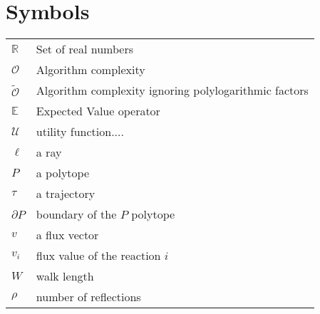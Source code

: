 \documentclass[master=elt, cleveref, autoref, masteroption=eg]{kulemt}
\def\RR{{\mathbb R}}
\newcommand{\OO}{\mathcal{O}\xspace}
\newcommand{\sO}{\widetilde{\mathcal{O}}\xspace}
\begin{document}
\section*{Symbols}
   \begin{flushleft}
   \renewcommand{\arraystretch}{1.1}
   \begin{tabularx}{\textwidth}{@{}p{12mm}X@{}}
      $\RR$          & Set of real numbers\\
      $\OO$          & Algorithm complexity\\
      $\sO$          & Algorithm complexity ignoring polylogarithmic factors\\
      $\mathbb{E}$   & Expected Value operator\\
      $\mathcal{U}$  & utility function....\\
      $\ell$         & a ray\\
      $P$            & a polytope\\
      $\tau$         & a trajectory\\
      $\partial P$   & boundary of the $P$ polytope\\
      $v$            & a flux vector\\
      $v_i$          & flux value of the reaction $i$\\
      $W$            & walk length\\
      $\rho$         & number of reflections\\
   \end{tabularx}
\end{flushleft}


\mainmatter

% 

% 

% 



% 

% 





\appendixpage*          
\appendix



\backmatter 







\end{document}
